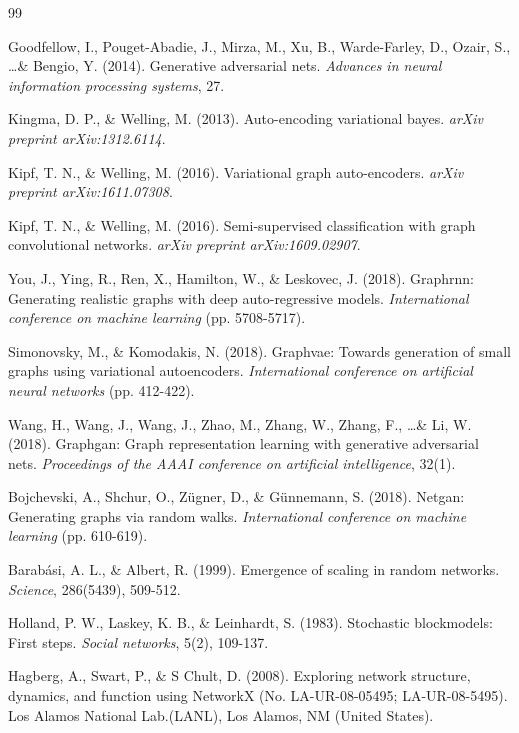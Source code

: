 \documentclass[12pt]{article}
\begin{document}

\begin{thebibliography}{99}

Goodfellow, I., Pouget-Abadie, J., Mirza, M., Xu, B., Warde-Farley, D., Ozair, S., \ldots \& Bengio, Y. (2014). Generative adversarial nets. \textit{Advances in neural information processing systems}, 27.

Kingma, D. P., \& Welling, M. (2013). Auto-encoding variational bayes. \textit{arXiv preprint arXiv:1312.6114}.

Kipf, T. N., \& Welling, M. (2016). Variational graph auto-encoders. \textit{arXiv preprint arXiv:1611.07308}.

Kipf, T. N., \& Welling, M. (2016). Semi-supervised classification with graph convolutional networks. \textit{arXiv preprint arXiv:1609.02907}.

You, J., Ying, R., Ren, X., Hamilton, W., \& Leskovec, J. (2018). Graphrnn: Generating realistic graphs with deep auto-regressive models. \textit{International conference on machine learning} (pp. 5708-5717).

Simonovsky, M., \& Komodakis, N. (2018). Graphvae: Towards generation of small graphs using variational autoencoders. \textit{International conference on artificial neural networks} (pp. 412-422).

Wang, H., Wang, J., Wang, J., Zhao, M., Zhang, W., Zhang, F., \ldots \& Li, W. (2018). Graphgan: Graph representation learning with generative adversarial nets. \textit{Proceedings of the AAAI conference on artificial intelligence}, 32(1).

Bojchevski, A., Shchur, O., Zügner, D., \& Günnemann, S. (2018). Netgan: Generating graphs via random walks. \textit{International conference on machine learning} (pp. 610-619).

Barabási, A. L., \& Albert, R. (1999). Emergence of scaling in random networks. \textit{Science}, 286(5439), 509-512.

Holland, P. W., Laskey, K. B., \& Leinhardt, S. (1983). Stochastic blockmodels: First steps. \textit{Social networks}, 5(2), 109-137.

Hagberg, A., Swart, P., \& S Chult, D. (2008). Exploring network structure, dynamics, and function using NetworkX (No. LA-UR-08-05495; LA-UR-08-5495). Los Alamos National Lab.(LANL), Los Alamos, NM (United States).

\end{thebibliography}
\end{document}
